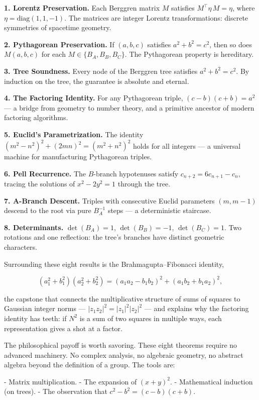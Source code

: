 \textbf{1. Lorentz Preservation.} Each Berggren matrix $M$ satisfies $M^\top \eta\, M = \eta$, where $\eta = \mathrm{diag}(1, 1, -1)$. The matrices are integer Lorentz transformations: discrete symmetries of spacetime geometry.

\textbf{2. Pythagorean Preservation.} If $(a, b, c)$ satisfies $a^2 + b^2 = c^2$, then so does $M(a, b, c)$ for each $M \in \{B_A, B_B, B_C\}$. The Pythagorean property is hereditary.

\textbf{3. Tree Soundness.} Every node of the Berggren tree satisfies $a^2 + b^2 = c^2$. By induction on the tree, the guarantee is absolute and eternal.

\textbf{4. The Factoring Identity.} For any Pythagorean triple, $(c - b)(c + b) = a^2$ --- a bridge from geometry to number theory, and a primitive ancestor of modern factoring algorithms.

\textbf{5. Euclid's Parametrization.} The identity $(m^2 - n^2)^2 + (2mn)^2 = (m^2 + n^2)^2$ holds for all integers --- a universal machine for manufacturing Pythagorean triples.

\textbf{6. Pell Recurrence.} The $B$-branch hypotenuses satisfy $c_{n+2} = 6c_{n+1} - c_n$, tracing the solutions of $x^2 - 2y^2 = 1$ through the tree.

\textbf{7. A-Branch Descent.} Triples with consecutive Euclid parameters $(m, m-1)$ descend to the root via pure $B_A^{-1}$ steps --- a deterministic staircase.

\textbf{8. Determinants.} $\det(B_A) = 1$, $\det(B_B) = -1$, $\det(B_C) = 1$. Two rotations and one reflection: the tree's branches have distinct geometric characters.

Surrounding these eight results is the Brahmagupta--Fibonacci identity,

\[
(a_1^2 + b_1^2)(a_2^2 + b_2^2) = (a_1 a_2 - b_1 b_2)^2 + (a_1 b_2 + b_1 a_2)^2,
\]

the capstone that connects the multiplicative structure of sums of squares to Gaussian integer norms --- $|z_1 z_2|^2 = |z_1|^2 |z_2|^2$ --- and explains why the factoring identity has teeth: if $N^2$ is a sum of two squares in multiple ways, each representation gives a shot at a factor.

The philosophical payoff is worth savoring. These eight theorems require no advanced machinery. No complex analysis, no algebraic geometry, no abstract algebra beyond the definition of a group. The tools are:

- Matrix multiplication.
- The expansion of $(x + y)^2$.
- Mathematical induction (on trees).
- The observation that $c^2 - b^2 = (c - b)(c + b)$.

